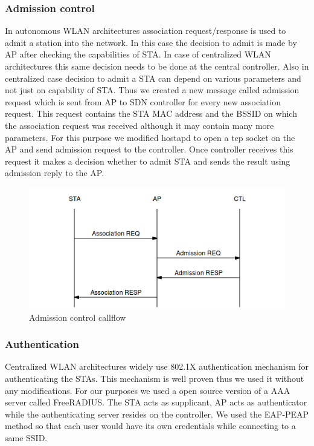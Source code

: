 \documentclass[12pt]{article}
\begin{document}
\subsubsection{Admission control}
In autonomous WLAN architectures association request/response is used to admit a station into the network. In this case the decision to admit is made by AP after checking the capabilities of STA. In case of centralized WLAN architectures this same decision needs to be done at the central controller. Also in centralized case decision to admit a STA can depend on various parameters and not just on capability of STA. Thus we created a new message called admission request which is sent from AP to SDN controller for every new association request. This request contains the STA MAC address and the BSSID on which the association request was received although it may contain many more parameters. For this purpose we modified hostapd\cite{hostapd} to open a tcp socket on the AP and send admission request to the controller. Once controller receives this request it makes a decision whether to admit STA and sends the result using admission reply to the AP.  
\begin{figure}
	\includegraphics[width=\linewidth]{adm_clf.png}
	\caption{Admission control callflow}
\end{figure}


\subsubsection{Authentication}
Centralized WLAN architectures widely use 802.1X authentication mechanism for authenticating the STAs. This mechanism is well proven thus we used it without any modifications. For our purposes we used a open source version of a AAA server called FreeRADIUS. The STA acts as  supplicant, AP acts as authenticator while the authenticating server resides on the controller. We used the EAP-PEAP method so that each user would have its own credentials while connecting to a same SSID.\\
\end{document}
